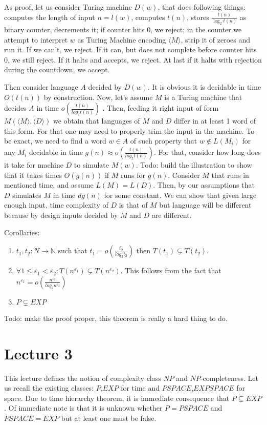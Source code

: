 \documentclass[12pt]{article}
\begin{document}
As proof, let us consider Turing machine \(D(w)\), that does following things: computes the length of input \(n=l(w)\), computes \(t(n)\), stores \(\frac {t(n)}{\log_2 t(n)}\) as binary counter, decrements it; if counter hits 0, we reject; in the counter we attempt to interpret \(w\) as Turing Machine encoding \(\langle M\rangle\), strip it of zeroes and run it. If we can't, we reject. If it can, but does not complete before counter hits 0, we still reject. If it halts and accepts, we reject. At last if it halts with rejection during the countdown, we accept.

Then consider language \(A\) decided by \(D(w)\). It is obvious it is decidable in time \(O(t(n))\) by construction. Now, let's assume \(M\) is a Turing machine that decides \(A\) in time \(o\left(\frac{t(n)}{log_2 t(n)}\right)\)  . Then, feeding it right input of form \(M(\langle M\rangle, \langle D\rangle)\) we obtain that languages of \(M\) and \(D\) differ in at least 1 word of this form. For that one may need to properly trim the input in the machine. To be exact, we need to find a word \(w\in A\) of such property that \(w\notin L(M_i)\) for any \(M_i\) decidable in time \(g(n)\approx o\left(\frac{t(n)}{log_2 t(n)}\right)\). For that, consider how long does it take for machine \(D\) to simulate \(M(w)\). Todo: build the illustration to show that it takes times \(O(g(n))\) if \(M\) runs for \(g(n)\). Consider \(M\) that runs in mentioned time, and assume \(L(M)=L(D)\). Then, by our assumptions that \(D\) simulates \(M\) in time \(d g(n)\) for some constant. We can show that given large enough input, time complexity of \(D\) is that of \(M\) but language will be different because by design inputs decided by \(M\) and \(D\) are different.

Corollaries:
\begin{enumerate}
\item \(t_1,t_2\colon N\to\mathbb N\) such that \(t_1=o\left(\frac{t_2}{log_2 t_2}\right)\) then \(T(t_1)\subsetneq T(t_2)\).
\item \(\forall 1\leq \varepsilon_1 < \varepsilon_2\colon T(n^{\varepsilon_1})\subsetneq T(n^{\varepsilon_2})\). This follows from the fact that \(n^{\varepsilon_1}=o\left(\frac{n^{\varepsilon_2}}{log_2 n^{\varepsilon_2}}\right)\)
\item \(P\subsetneq EXP\)
\end{enumerate}
Todo: make the proof proper, this theorem is really a hard thing to do.

\section{Lecture 3}
This lecture defines the notion of complexity class \(NP\) and \(NP\)-completeness. Let us recall the existing classes: \(P\),\(EXP\) for time and \(PSPACE\),\(EXPSPACE\) for space. Due to time hierarchy theorem, it is immediate consequence that \(P\subsetneq EXP\). Of immediate note is that it is unknown whether \(P=PSPACE\) and \(PSPACE=EXP\) but at least one must be false.
\end{document}
